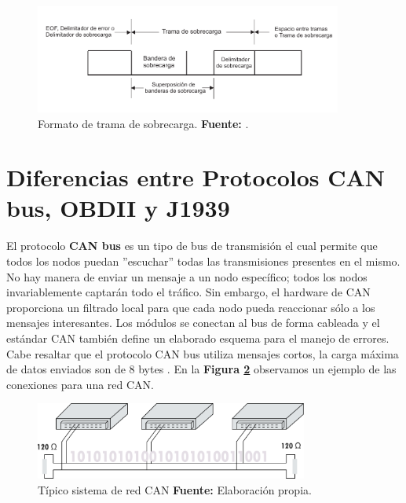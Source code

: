 \begin{itemize}
			\begin{figure}[H]
			\centering
				\includegraphics[width=0.9\textwidth]{./Cap2imagen/sobrecarga.pdf}
			\caption[Formato de trama de sobrecarga.]{Formato de trama de sobrecarga.\textbf{ Fuente:} \cite{DSEEPC}.}
			\label{TSC} 
			\end{figure}
				
\end{itemize}




\section{Diferencias entre Protocolos CAN bus,  OBDII y J1939}
El protocolo {\bfseries CAN bus} es un tipo de bus de transmisión el cual permite que todos los nodos puedan ''escuchar'' todas las transmisiones presentes en el mismo. No hay manera de enviar un mensaje a un nodo específico; todos los nodos invariablemente captarán todo el tráfico. Sin embargo, el hardware de CAN proporciona un filtrado local para que cada nodo pueda reaccionar sólo a los mensajes interesantes. Los módulos se conectan al bus de forma cableada y el estándar CAN también define un elaborado esquema para el manejo de errores. Cabe resaltar que el protocolo CAN bus utiliza mensajes cortos, la carga máxima de datos enviados son de 8 bytes \cite{can_c3}. En la \textbf{Figura \ref{fig_can_c3}} observamos un ejemplo de las conexiones para una red CAN. 

\begin{figure}[H]
	\centering
	\includegraphics[width=0.8\textwidth]{./Cap3imagen/can.pdf}
	\caption [Típico sistema de red CAN.]{Típico sistema de red CAN\textbf{ Fuente:} %
		Elaboración propia.}
	\label{fig_can_c3} %
\end{figure}

